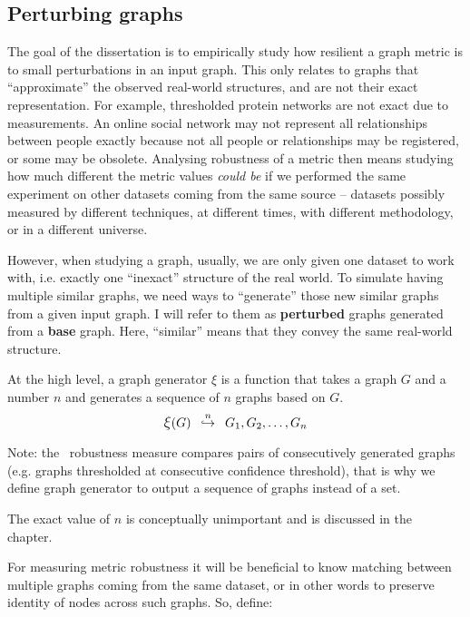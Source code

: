
\subsection{Perturbing graphs}\label{sec:perturbing_graphs}

The goal of the dissertation is to empirically study how resilient a graph metric is to small perturbations in an input graph.
This only relates to graphs that ``approximate'' the observed real-world structures, and are not their exact representation.
For example, thresholded protein networks are not exact due to measurements.
An online social network may not represent all relationships between people exactly because not all people or relationships may be registered, or some may be obsolete.
Analysing robustness of a metric then means studying how much different the metric values \textsl{could be} if we performed the same experiment on other datasets coming from the same source -- datasets possibly measured by different techniques, at different times, with different methodology, or in a different universe.

However, when studying a graph, usually, we are only given one dataset to work with, i.e. exactly one ``inexact'' structure of the real world.
To simulate having multiple similar graphs, we need ways to ``generate'' those new similar graphs from a given input graph.
I will refer to them as \textbf{perturbed} graphs generated from a \textbf{base} graph.
Here, ``similar'' means that they convey the same real-world structure.

At the high level, a graph generator $\xi$ is a function that takes a graph $G$ and a number $n$ and generates a sequence of $n$ graphs based on $G$.
\begin{equation}
    \mathlarger{\xi}(G) \generates{n} G_1, G_2, \dots, G_n
\end{equation}

Note: the~ robustness measure compares pairs of consecutively generated graphs (e.g. graphs thresholded at consecutive confidence threshold), that is why we define graph generator to output a sequence of graphs instead of a set.

The exact value of $n$ is conceptually unimportant and is discussed in the~ chapter.

\parspace

For measuring metric robustness it will be beneficial to know matching between multiple graphs coming from the same dataset, or in other words to preserve identity of nodes across such graphs.
So, define:

